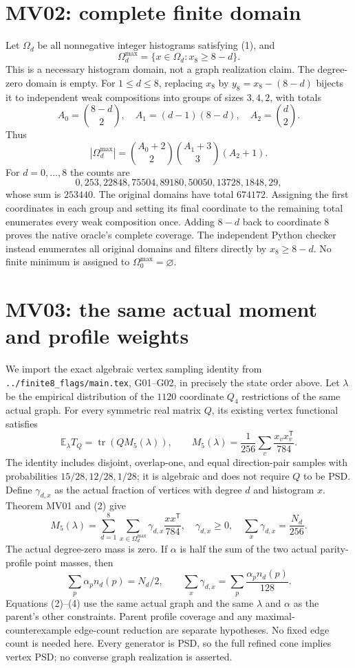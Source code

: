 \documentclass[11pt]{article}
\newcommand{\Om}{\Omega^{\mathrm{max}}}
\begin{document}
\section{MV02: complete finite domain}
Let $\Omega_d$ be all nonnegative integer histograms satisfying (1), and
\[
 \Om_d=\{x\in\Omega_d:x_8\ge8-d\}.
\]
This is a necessary histogram domain, not a graph realization claim.
The degree-zero domain is empty. For $1\le d\le8$, replacing $x_8$
by $y_8=x_8-(8-d)$ bijects it to independent weak compositions into
groups of sizes $3,4,2$, with totals
\[
 A_0=\binom{8-d}{2},\quad A_1=(d-1)(8-d),\quad A_2=\binom d2.
\]
Thus
\[
 |\Om_d|=\binom{A_0+2}{2}\binom{A_1+3}{3}(A_2+1).
\]
For $d=0,\ldots,8$ the counts are
\[
 0,253,22848,75504,89180,50050,13728,1848,29,
\]
whose sum is $253440$. The original domains have total $674172$.
Assigning the first coordinates in each group and setting its final
coordinate to the remaining total enumerates every weak composition
once. Adding $8-d$ back to coordinate $8$ proves the native oracle's
complete coverage. The independent Python checker instead enumerates
all original domains and filters directly by $x_8\ge8-d$.
No finite minimum is assigned to $\Om_0=\varnothing$.

\section{MV03: the same actual moment and profile weights}
We import the exact algebraic vertex sampling identity from
\texttt{../finite8\_flags/main.tex}, G01--G02, in precisely the state order
above. Let $\lambda$ be the empirical distribution of the $1120$
coordinate $Q_4$ restrictions of the same actual graph. For every
symmetric real matrix $Q$, its existing vertex functional satisfies
\[
 \mathbb E_\lambda T_Q=\operatorname{tr}(Q M_5(\lambda)),\qquad
 M_5(\lambda)=\frac1{256}\sum_v\frac{x_vx_v^{\mathsf T}}{784}.       \tag{2}
\]
The identity includes disjoint, overlap-one, and equal direction-pair
samples with probabilities $15/28,12/28,1/28$; it is algebraic and does
not require $Q$ to be PSD.
Define $\gamma_{d,x}$ as the actual fraction of vertices with degree
$d$ and histogram $x$. Theorem MV01 and (2) give
\[
 M_5(\lambda)=\sum_{d=1}^8\sum_{x\in\Om_d}
       \gamma_{d,x}\frac{xx^{\mathsf T}}{784},\quad
 \gamma_{d,x}\ge0,\quad \sum_x\gamma_{d,x}=\frac{N_d}{256}.         \tag{3}
\]
The actual degree-zero mass is zero. If $\alpha$ is half the sum of the
two actual parity-profile point masses, then
\[
 \sum_p\alpha_p n_d(p)=N_d/2,\qquad
 \sum_x\gamma_{d,x}=\sum_p\frac{\alpha_p n_d(p)}{128}.             \tag{4}
\]
Equations (2)--(4) use the same actual graph and the same $\lambda$ and
$\alpha$ as the parent's other constraints. Parent profile coverage
and any maximal-counterexample edge-count reduction are separate
hypotheses. No fixed edge count is needed here.
Every generator is PSD, so the full refined cone implies vertex PSD;
no converse graph realization is asserted.
\end{document}
